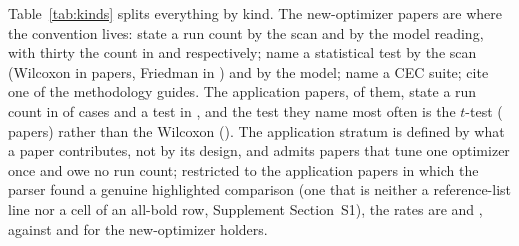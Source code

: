 \documentclass[preprint,review,12pt]{elsarticle}
\begin{document}
Table~\ref{tab:kinds} splits everything by kind. The new-optimizer papers are where the convention lives: \nSkNewOptimizerPctRunsStated{} state a run count by the scan and \nTrNewOptimizerPctRunsStated{} by the model reading, with thirty the count in \nSkNewOptimizerPctThirtyModal{} and \nTrNewOptimizerPctRunsThirty{} respectively; \nSkNewOptimizerPctTestNamed{} name a statistical test by the scan (Wilcoxon in \nSkNewOptimizerWilcoxon{} papers, Friedman in \nSkNewOptimizerFriedman{}) and \nTrNewOptimizerPctTestNamed{} by the model; \nSkNewOptimizerPctCec{} name a CEC suite; \nSkNewOptimizerPctCitesMethodology{} cite one of the methodology guides. The application papers, \nKcApplication{} of them, state a run count in \nSkApplicationPctRunsStated{} of cases and a test in \nSkApplicationPctTestNamed{}, and the test they name most often is the $t$-test (\nSkApplicationTTest{} papers) rather than the Wilcoxon (\nSkApplicationWilcoxon{}). The application stratum is defined by what a paper contributes, not by its design, and admits papers that tune one optimizer once and owe no run count; restricted to the \nHkApplicationPapers{} application papers in which the parser found a genuine highlighted comparison (one that is neither a reference-list line nor a cell of an all-bold row, Supplement Section~S1), the rates are \nHkApplicationPctRunsStated{} and \nHkApplicationPctTestNamed{}, against \nHkNewOptimizerPctRunsStated{} and \nHkNewOptimizerPctTestNamed{} for the \nHkNewOptimizerPapers{} new-optimizer holders.
\end{document}
